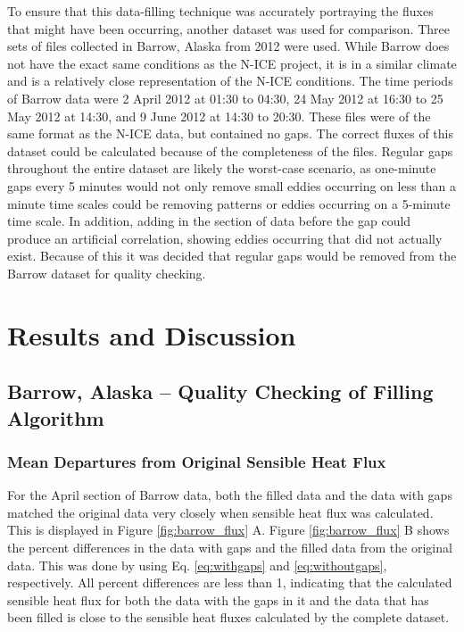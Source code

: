 To ensure that this data-filling technique was accurately portraying the fluxes that might have been occurring, another dataset was used for comparison. Three sets of files collected in Barrow, Alaska from 2012 were used. While Barrow does not have the exact same conditions as the N-ICE project, it is in a similar climate and is a relatively close representation of the N-ICE conditions. The time periods of Barrow data were 2 April 2012 at 01:30 to 04:30, 24 May 2012 at 16:30 to 25 May 2012 at 14:30, and 9 June 2012 at 14:30 to 20:30. These files were of the same format as the N-ICE data, but contained no gaps.  The correct fluxes of this dataset could be calculated because of the completeness of the files. Regular gaps throughout the entire dataset are likely the worst-case scenario, as one-minute gaps every 5 minutes would not only remove small eddies occurring on less than a minute time scales could be removing patterns or eddies occurring on a 5-minute time scale. In addition, adding in the section of data before the gap could produce an artificial correlation, showing eddies occurring that did not actually exist. Because of this it was decided that regular gaps would be removed from the Barrow dataset for quality checking. 

\section{Results and Discussion}
\subsection{Barrow, Alaska – Quality Checking of Filling Algorithm}
\subsubsection{Mean Departures from Original Sensible Heat Flux}
For the April section of Barrow data, both the filled data and the data with gaps matched the original data very closely when sensible heat flux was calculated. This is displayed in Figure \ref{fig:barrow_flux} A. Figure \ref{fig:barrow_flux} B shows the percent differences in the data with gaps and the filled data from the original data. This was done by using Eq. \ref{eq:withgaps} and \ref{eq:withoutgaps}, respectively. All percent differences are less than 1, indicating that the calculated sensible heat flux for both the data with the gaps in it and the data that has been filled is close to the sensible heat fluxes calculated by the complete dataset.

